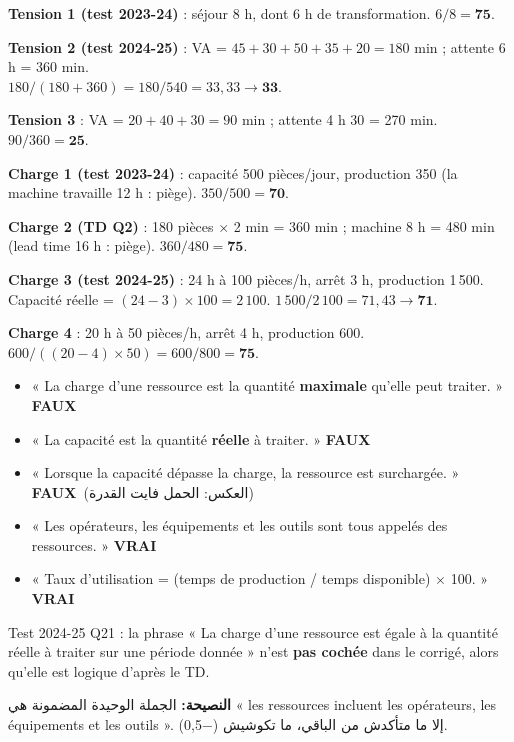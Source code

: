 \documentclass[11pt,a4paper]{article}
\newcommand{\ar}[1]{\textarabic{#1}}
\newcommand{\fr}[1]{\textfrench{#1}}
\newcommand{\vrai}{\textcolor{vert}{\textbf{VRAI}}}
\newcommand{\faux}{\textcolor{rouge}{\textbf{FAUX}}}
\begin{document}
\begin{exemple}
\textbf{Tension 1 (test 2023-24)} : séjour 8 h, dont 6 h de transformation. \quad $6/8 = \mathbf{75}$.

\textbf{Tension 2 (test 2024-25)} : VA = $45+30+50+35+20 = 180$ min ; attente 6 h = 360 min.\\
$180/(180+360) = 180/540 = 33{,}33 \rightarrow \mathbf{33}$.

\textbf{Tension 3} : VA = $20+40+30 = 90$ min ; attente 4 h 30 = 270 min. \quad $90/360 = \mathbf{25}$.

\textbf{Charge 1 (test 2023-24)} : capacité 500 pièces/jour, production 350 (la machine travaille 12 h : piège). \quad $350/500 = \mathbf{70}$.

\textbf{Charge 2 (TD Q2)} : 180 pièces $\times$ 2 min = 360 min ; machine 8 h = 480 min (lead time 16 h : piège). \quad $360/480 = \mathbf{75}$.

\textbf{Charge 3 (test 2024-25)} : 24 h à 100 pièces/h, arrêt 3 h, production 1\,500.\\
Capacité réelle = $(24-3)\times 100 = 2\,100$. \quad $1\,500/2\,100 = 71{,}43 \rightarrow \mathbf{71}$.

\textbf{Charge 4} : 20 h à 50 pièces/h, arrêt 4 h, production 600. \quad $600/((20-4)\times 50) = 600/800 = \mathbf{75}$.
\end{exemple}

\begin{piege}
\begin{itemize}
\item « La charge d'une ressource est la quantité \textbf{maximale} qu'elle peut traiter. » \faux
\item « La capacité est la quantité \textbf{réelle} à traiter. » \faux
\item « Lorsque la capacité dépasse la charge, la ressource est surchargée. » \faux \ \ar{(العكس: الحمل فايت القدرة)}
\item « Les opérateurs, les équipements et les outils sont tous appelés des ressources. » \vrai
\item « Taux d'utilisation = (temps de production / temps disponible) $\times$ 100. » \vrai
\end{itemize}
\end{piege}

\begin{alerte}
Test 2024-25 Q21 : la phrase « La charge d'une ressource est égale à la quantité réelle à traiter sur une période donnée » n'est \textbf{pas cochée} dans le corrigé, alors qu'elle est logique d'après le TD.
\par\begin{Arabic}
\textbf{النصيحة:} الجملة الوحيدة المضمونة هي « \fr{les ressources incluent les opérateurs, les équipements et les outils} ». إلا ما متأكدش من الباقي، ما تكوشيش (\fr{−0,5}).
\end{Arabic}
\end{alerte}
\end{document}

